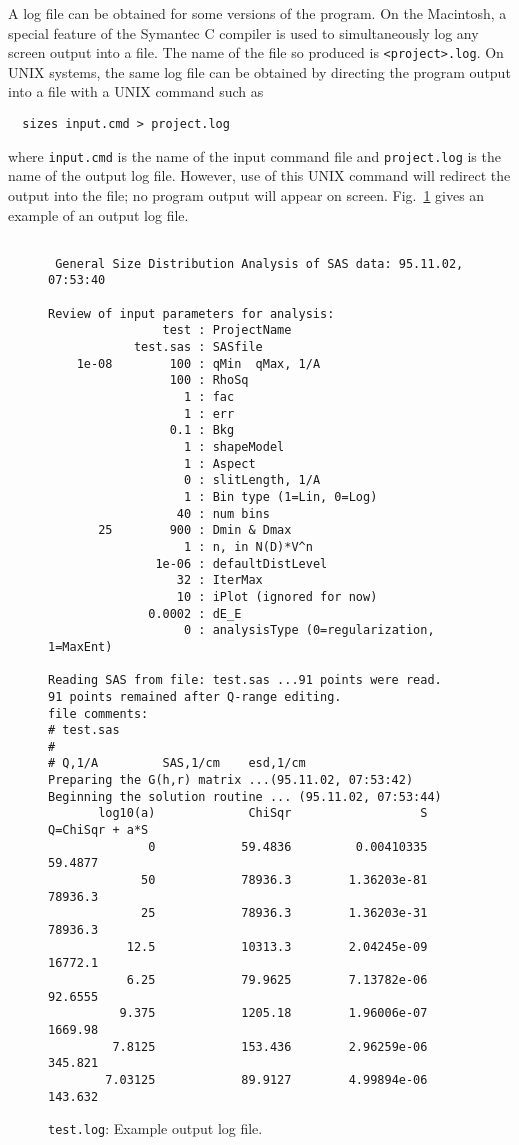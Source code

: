 \documentclass[letterpaper]{article}
\newlength{\fminilength}
\newenvironment{fminipage}[1][\linewidth]
 {\setlength{\fminilength}{#1}%
    \addtolength{\fminilength}{-2\fboxsep}%
    \addtolength{\fminilength}{-2\fboxrule}%
    \begin{lrbox}{\fminibox}\begin{minipage}{\fminilength}}
 {\end{minipage}\end{lrbox}\noindent\fbox{\usebox{\fminibox}}}
\begin{document}
A log file can be obtained for some versions of the 
program.  On the Macintosh, a special feature of the 
Symantec C compiler is used to simultaneously log any 
screen output into a file.  The name of the file so 
produced is \texttt{<project>.log}.  On UNIX systems, the same 
log file can be obtained by directing the program output 
into a file with a UNIX command such as
\begin{verbatim}
  sizes input.cmd > project.log
\end{verbatim}
where \texttt{input.cmd} is the name of the input 
command file and \texttt{project.log} is the name of 
the output log file.  However, use of this UNIX 
command will redirect the output into the file; no 
program output will appear on screen.
Fig.~\ref{f:test.log} gives an example of an output 
log file.
\begin{figure}[tbp]
\begin{center}
\begin{fminipage}[0.8\linewidth]
\small\begin{verbatim}

 General Size Distribution Analysis of SAS data: 95.11.02, 07:53:40

Review of input parameters for analysis:
                test : ProjectName
            test.sas : SASfile
    1e-08        100 : qMin  qMax, 1/A
                 100 : RhoSq
                   1 : fac
                   1 : err
                 0.1 : Bkg
                   1 : shapeModel
                   1 : Aspect
                   0 : slitLength, 1/A
                   1 : Bin type (1=Lin, 0=Log)
                  40 : num bins
       25        900 : Dmin & Dmax
                   1 : n, in N(D)*V^n
               1e-06 : defaultDistLevel
                  32 : IterMax
                  10 : iPlot (ignored for now)
              0.0002 : dE_E
                   0 : analysisType (0=regularization, 1=MaxEnt)

Reading SAS from file: test.sas ...91 points were read.
91 points remained after Q-range editing.
file comments:
# test.sas
#
# Q,1/A         SAS,1/cm    esd,1/cm
Preparing the G(h,r) matrix ...(95.11.02, 07:53:42)
Beginning the solution routine ... (95.11.02, 07:53:44)
       log10(a)             ChiSqr                  S     Q=ChiSqr + a*S
              0            59.4836         0.00410335            59.4877
             50            78936.3        1.36203e-81            78936.3
             25            78936.3        1.36203e-31            78936.3
           12.5            10313.3        2.04245e-09            16772.1
           6.25            79.9625        7.13782e-06            92.6555
          9.375            1205.18        1.96006e-07            1669.98
         7.8125            153.436        2.96259e-06            345.821
        7.03125            89.9127        4.99894e-06            143.632
\end{verbatim}
\end{fminipage}
\end{center}
 \caption{\texttt{test.log}: Example output log file.}
 \protect\label{f:test.log}
\end{figure}
\end{document}
